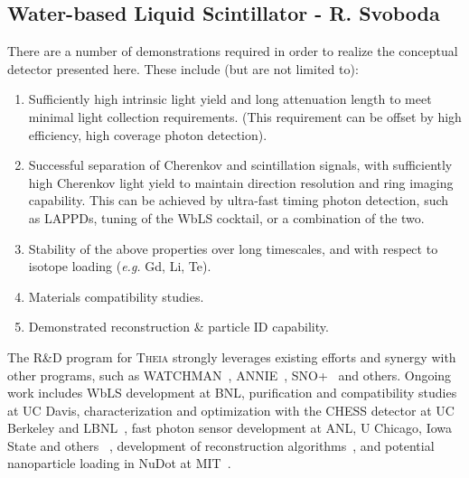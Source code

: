 \subsection{Water-based Liquid Scintillator - R. Svoboda}


There are a number of demonstrations required in order to realize the conceptual detector presented here.  These include (but are not limited to): 
\begin{enumerate}
\item Sufficiently high intrinsic light yield and long attenuation length to meet minimal light collection requirements.   (This  requirement can be offset by high efficiency, high coverage photon detection).
\item Successful separation of  Cherenkov and scintillation signals, with sufficiently high Cherenkov light yield to maintain direction resolution and ring imaging capability.  This can be achieved by ultra-fast timing photon detection, such as LAPPDs, tuning of the WbLS cocktail, or a combination of the two.
\item Stability of the above properties over long timescales, and with respect to isotope loading ({\it e.g.} Gd, Li, Te).
\item Materials compatibility studies.
\item Demonstrated reconstruction \& particle ID capability.
\end{enumerate}

The R\&D program for \textsc{Theia} strongly leverages existing efforts and synergy with other programs, such as WATCHMAN~\cite{wm}, ANNIE~\cite{annie}, SNO+~\cite{snopl} and others.  Ongoing work includes WbLS development at BNL, purification and compatibility studies at UC Davis, characterization and optimization with the CHESS detector at UC Berkeley and LBNL~\cite{chess, chess2}, fast photon sensor development at ANL, U Chicago, Iowa State and others ~\cite{mcp--lappd3}, development of reconstruction algorithms~\cite{elagin, elagin2}, and potential nanoparticle loading in NuDot at MIT~\cite{nudot}.
